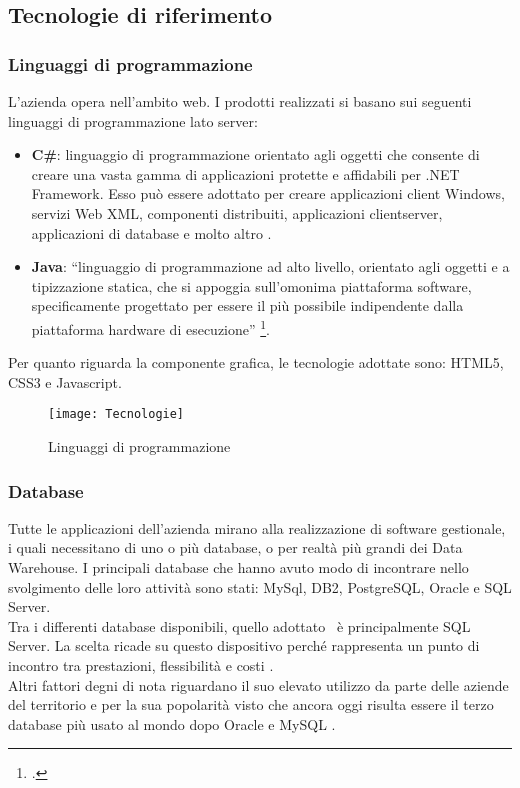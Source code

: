 \subsection{Tecnologie di riferimento}
\label{cap1:Tecnologie di riferimento}
\subsubsection*{Linguaggi di programmazione}

L'azienda opera nell'ambito web. I prodotti realizzati si basano sui seguenti linguaggi di programmazione lato server: 
\begin{itemize}
	\item \textbf{C\#}: linguaggio di programmazione orientato agli oggetti che consente di creare una vasta gamma di applicazioni protette e affidabili per .NET Framework. Esso può essere adottato per creare applicazioni client Windows, servizi Web XML, componenti distribuiti, applicazioni client\-server, applicazioni di database e molto altro \cite{[3]}.
	
	\item \textbf{Java}: ``linguaggio di programmazione ad alto livello, orientato agli oggetti e a tipizzazione statica, che si appoggia sull'omonima piattaforma software, specificamente progettato per essere il più possibile indipendente dalla piattaforma hardware di esecuzione'' \footcite{[4]}.
\end{itemize}

Per quanto riguarda la componente grafica, le tecnologie adottate sono: HTML5, CSS3 e Javascript.

\begin{figure}[!h] 
	\centering 
	\texttt{[image: Tecnologie]} 
	\caption{Linguaggi di programmazione}
	\label{tecnologie}
\end{figure}

\subsubsection*{Database}
Tutte le applicazioni dell'azienda mirano alla realizzazione di software gestionale, i quali necessitano di uno o più database, o per realtà più grandi dei Data Warehouse. I principali  database che hanno avuto modo di incontrare nello svolgimento delle loro attività sono stati: MySql, DB2, PostgreSQL, Oracle e SQL Server.\\

Tra i differenti database disponibili, quello adottato \azienda\ è principalmente SQL Server. La scelta ricade su questo dispositivo perché rappresenta un punto di incontro tra prestazioni, flessibilità e costi \cite{[5]}.\\
Altri fattori degni di nota riguardano il suo elevato utilizzo da parte delle aziende del territorio e per la sua popolarità visto che ancora oggi risulta essere il terzo database più usato al mondo dopo Oracle e MySQL \cite{[6]}. 

